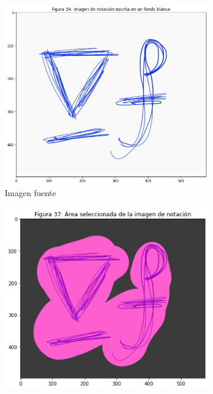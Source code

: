 \documentclass[11pt,twoside,titlepage,a4paper]{article}
\numberwithin{equation}{section} %
\theoremstyle{usual}
\begin{document}
\begin{figure}[h]
    \centering
    \begin{subfigure}[b]{.4\textwidth}
        \centering
        \includegraphics[width=\textwidth]{imagenes/PoissonImageEditing_cell_48_output_0.png}
        \caption{Imagen fuente}
    \end{subfigure}
     \begin{subfigure}[b]{.4\textwidth}
        \centering
        \includegraphics[width=\textwidth]{imagenes/PoissonImageEditing_cell_48_output_3.png}

\end{subfigure}
\end{figure}
\end{document}
